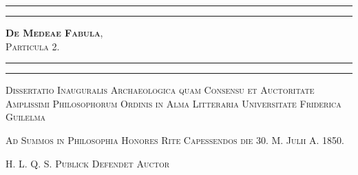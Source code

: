 \documentclass[landscape, a4paper, 11pt, oneside, polutonikogreek, german]{article}
\begin{document}
\renewcommand\thefootnote{{\color{myGreen}{\arabic{footnote}}}}
\let\oldfootnote\footnote
    \renewcommand{\footnote}[1]{\oldfootnote{{\color{myGreen}#1}}}
\begin{titlepage} %
	\centering %

	
	\rule{\textwidth}{1.6pt}\vspace*{-\baselineskip}\vspace*{2pt} %
	\rule{\textwidth}{0.4pt} %
	
	\vspace{0.1\baselineskip} %
	
	{\scshape\Huge \textbf{De Medeae Fabula},\\ \Large Particula 2.}
	
	\vspace{0.1\baselineskip} %

	\rule{\textwidth}{0.4pt}\vspace*{-\baselineskip}\vspace{3.2pt} %
	\rule{\textwidth}{1.6pt} %
	
	\vspace{1\baselineskip} %
	
	
	{\scshape \large Dissertatio Inauguralis Archaeologica quam Consensu et Auctoritate Amplissimi Philosophorum Ordinis in Alma Litteraria Universitate Friderica Guilelma}
 
        \vspace{0.5\baselineskip}
        
        {\scshape \small Ad Summos in Philosophia Honores Rite Capessendos die 30. M. Julii A. 1850.}

        \vspace{0.25\baselineskip}
        
        {\scshape \scriptsize H. L. Q. S. Publick Defendet Auctor} %
	
	\vspace*{0.1\baselineskip} %
	

\end{titlepage}
\end{document}
